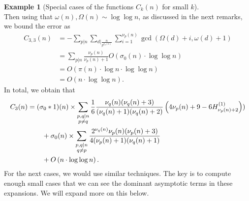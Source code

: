 \documentclass[11pt,reqno,a4letter]{article}
\numberwithin{figure}{section}
\numberwithin{table}{section}
\theoremstyle{plain}
\numberwithin{theorem}{section}
\theoremstyle{definition}
\newtheorem{example}[theorem]{Example}
\begin{document}
\begin{example}[Special cases of the functions $C_k(n)$ for small $k$]
\[\] 
Then using that $\omega(n), \Omega(n) \sim \log\log n$, as discussed in the next remarks, we bound the 
error as 
\begin{align*} 
C_{3,3}(n) & = -\sum_{p|n} \sum_{d\rvert\frac{n}{p^{\nu_p(n)}}} \sum_{i=1}^{\nu_p(n)} 
     \gcd\left(\Omega(d) + i, \omega(d) + 1\right) \\ 
     & = \sum_{p|n} \frac{\nu_p(n)}{\nu_p(n) + 1} O\left(\sigma_0(n) \cdot \log\log n\right) \\ 
     & = O\left(\pi(n) \cdot \log n \cdot \log\log n\right) \\ 
     & = O\left(n \cdot \log\log n\right). 
\end{align*} 
In total, we obtain that 
\begin{align} 
\label{eqn_ExactFormula_Ck3n} 
C_3(n) & = (\sigma_0 \ast 1)(n) \times \sum_{\substack{p,q|n \\ p \neq q}} 
     \frac{1}{6}\frac{\nu_q(n) (\nu_q(n) + 3)}{ 
     (\nu_q(n)+1)(\nu_q(n)+2)} \left(4\nu_p(n)+9-6 H_{\nu_p(n)+2}^{(1)}\right)) \\ 
\notag 
     & \phantom{= \quad\ } + 
     \sigma_0(n) \times \sum_{\substack{p,q|n \\ q \neq p}} 
     \frac{2^{\nu_q(n)} \nu_p(n) (\nu_p(n) + 3)}{4 (\nu_p(n) + 1) (\nu_q(n) + 1)} \\ 
\notag
     & \phantom{= \quad\ } + 
     O\left(n \cdot \log\log n\right). 
\end{align} 
For the next cases, we would use similar techniques. The key is to compute enough small cases that we can see 
the dominant asymptotic terms in these expansions. We will expand more on this below. 
\end{example}
\end{document}
